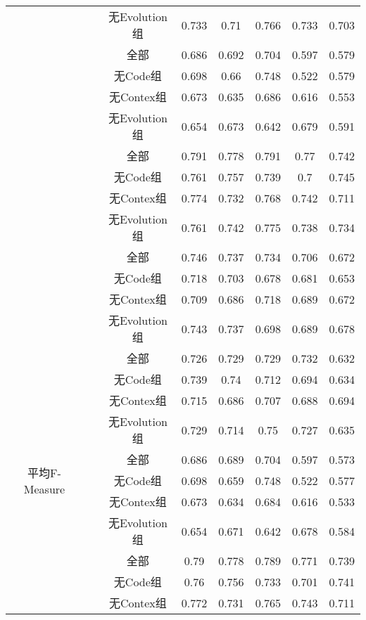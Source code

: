 \begin{table} [htbp]
\begin{tabular}{cccccccc}
&&无Evolution组& 0.733    & 0.71   & 0.766 & 0.733 & 0.703 \\
\cline{2-8}
&~\multirow{4}{*}{jEdit}
&全部     & 0.686    & 0.692  & 0.704 & 0.597 & 0.579 \\
&&无Code组  & 0.698    & 0.66   & 0.748 & 0.522 & 0.579 \\
&&无Contex组 & 0.673    & 0.635  & 0.686 & 0.616 & 0.553 \\
&&无Evolution组& 0.654    & 0.673  & 0.642 & 0.679 & 0.591 \\
\cline{2-8}
&~\multirow{4}{*}{jFreeChart} 
&全部     & 0.791    & 0.778  & 0.791 & 0.77  & 0.742 \\
&&无Code组  & 0.761    & 0.757  & 0.739 & 0.7   & 0.745 \\
&&无Contex组 & 0.774    & 0.732  & 0.768 & 0.742 & 0.711 \\
&&无Evolution组& 0.761    & 0.742  & 0.775 & 0.738 & 0.734 \\
\cline{2-8}
&~\multirow{4}{*}{Tuxguitar} 
&全部    & 0.746    & 0.737  & 0.734 & 0.706 & 0.672 \\
&&无Code组  & 0.718    & 0.703  & 0.678 & 0.681 & 0.653 \\
&&无Contex组 & 0.709    & 0.686  & 0.718 & 0.689 & 0.672 \\
&&无Evolution组& 0.743    & 0.737  & 0.698 & 0.689 & 0.678 \\
\hline
\multirow{16}{*}{平均F-Measure }
&~\multirow{4}{*}{ArgoUML}
&全部     & 0.726    & 0.729  & 0.729 & 0.732 & 0.632 \\
&&无Code组  & 0.739    & 0.74   & 0.712 & 0.694 & 0.634 \\
&&无Contex组 & 0.715    & 0.686  & 0.707 & 0.688 & 0.694 \\
&&无Evolution组& 0.729    & 0.714  & 0.75  & 0.727 & 0.635 \\
\cline{2-8}
&~\multirow{4}{*}{jEdit} 
&全部      & 0.686    & 0.689  & 0.704 & 0.597 & 0.573 \\
&&无Code组  & 0.698    & 0.659  & 0.748 & 0.522 & 0.577 \\
&&无Contex组 & 0.673    & 0.634  & 0.684 & 0.616 & 0.533 \\
&&无Evolution组& 0.654    & 0.671  & 0.642 & 0.678 & 0.584 \\
\cline{2-8}
&~\multirow{4}{*}{jFreeChart} 
&全部       & 0.79     & 0.778  & 0.789 & 0.771 & 0.739 \\
&&无Code组   & 0.76     & 0.756  & 0.733 & 0.701 & 0.741 \\
&&无Contex组 & 0.772    & 0.731  & 0.765 & 0.743 & 0.711 \\

\end{tabular}
\end{table}

